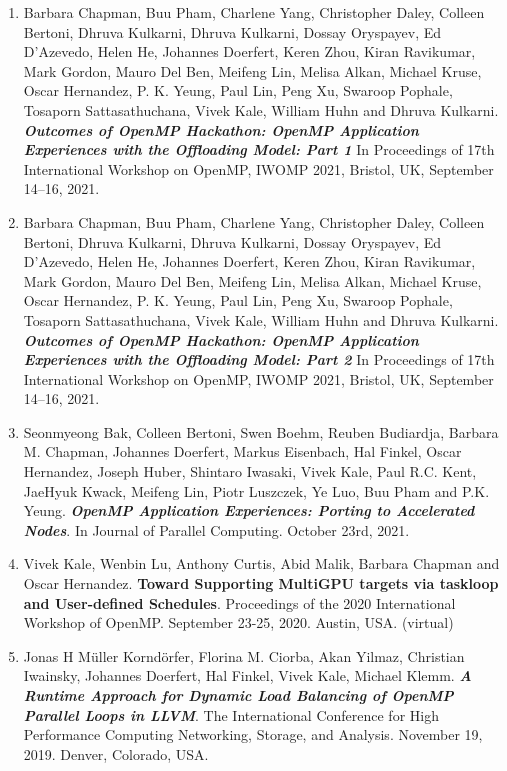 \begin{enumerate}
\item Barbara Chapman, Buu Pham, Charlene Yang, Christopher Daley, Colleen Bertoni, Dhruva Kulkarni, Dhruva Kulkarni, Dossay Oryspayev, Ed D’Azevedo, Helen He, Johannes Doerfert, Keren Zhou, Kiran Ravikumar, Mark Gordon, Mauro Del Ben, Meifeng Lin, Melisa Alkan, Michael Kruse, Oscar Hernandez, P. K. Yeung, Paul Lin, Peng Xu, Swaroop Pophale, Tosaporn Sattasathuchana, Vivek Kale, William Huhn and Dhruva Kulkarni. \textbf{\textit{Outcomes of OpenMP Hackathon: OpenMP Application Experiences with the Offloading Model: Part 1}} In Proceedings of 17th International Workshop on OpenMP, IWOMP 2021, Bristol, UK, September 14–16, 2021. 

\item Barbara Chapman, Buu Pham, Charlene Yang, Christopher Daley, Colleen Bertoni, Dhruva Kulkarni, Dhruva Kulkarni, Dossay Oryspayev, Ed D’Azevedo, Helen He, Johannes Doerfert, Keren Zhou, Kiran Ravikumar, Mark Gordon, Mauro Del Ben, Meifeng Lin, Melisa Alkan, Michael Kruse, Oscar Hernandez, P. K. Yeung, Paul Lin, Peng Xu, Swaroop Pophale, Tosaporn Sattasathuchana, Vivek Kale, William Huhn and Dhruva Kulkarni. \textbf{\textit{Outcomes of OpenMP Hackathon: OpenMP Application Experiences with the Offloading Model: Part 2}} In Proceedings of 17th International Workshop on OpenMP, IWOMP 2021, Bristol, UK, September 14–16, 2021. 

\item Seonmyeong Bak, Colleen Bertoni, Swen Boehm, Reuben Budiardja, Barbara M. Chapman, Johannes Doerfert, Markus Eisenbach, Hal Finkel, Oscar Hernandez, Joseph Huber, Shintaro Iwasaki, Vivek Kale, Paul R.C. Kent, JaeHyuk Kwack, Meifeng Lin, Piotr Luszczek, Ye Luo, Buu Pham and P.K. Yeung. \textbf{\textit{OpenMP Application Experiences: Porting to Accelerated Nodes}}.  In Journal of Parallel Computing. October 23rd, 2021.

\item Vivek Kale, Wenbin Lu, Anthony Curtis, Abid Malik, Barbara Chapman and Oscar Hernandez. \textbf{\textbf{Toward Supporting MultiGPU targets via taskloop and User-defined Schedules}}. Proceedings of the 2020 International Workshop of OpenMP. September 23-25, 2020. Austin, USA. (virtual) 

\item Jonas H Müller Korndörfer, Florina M. Ciorba, Akan Yilmaz, Christian Iwainsky, Johannes Doerfert, Hal Finkel, Vivek Kale, Michael Klemm. \textbf{\textit{A Runtime Approach for Dynamic Load Balancing of OpenMP Parallel Loops in LLVM}}. The International Conference for High Performance Computing Networking, Storage, and Analysis. November 19, 2019. Denver, Colorado, USA.


\end{enumerate}
